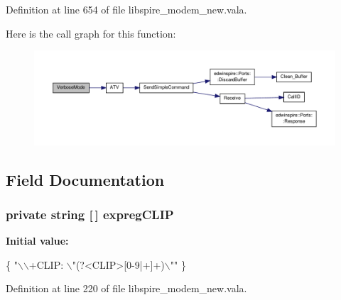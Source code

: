 Definition at line 654 of file libspire\-\_\-modem\-\_\-new.\-vala.



Here is the call graph for this function\-:\nopagebreak
\begin{figure}[H]
\begin{center}
\leavevmode
\includegraphics[width=350pt]{classedwinspire_1_1_ports_1_1_modem_a9f637839b975c7d8790461440e10abfd_cgraph}
\end{center}
\end{figure}




\subsection{Field Documentation}
\hypertarget{classedwinspire_1_1_ports_1_1_modem_a4c8278a9e11f6d3e376d161ad2d21cb0}{
\subsubsection[{expreg\-C\-L\-I\-P}]{\setlength{\rightskip}{0pt plus 5cm}private string \mbox{[}$\,$\mbox{]} expreg\-C\-L\-I\-P\hspace{0.3cm}{\ttfamily [private]}}}\label{classedwinspire_1_1_ports_1_1_modem_a4c8278a9e11f6d3e376d161ad2d21cb0}
{\bfseries Initial value\-:}
\begin{DoxyCode}
 \{
                                \textcolor{stringliteral}{"\(\backslash\)\(\backslash\)+CLIP: \(\backslash\)"(?<CLIP>[0-9|+]+)\(\backslash\)""}
                        \}
\end{DoxyCode}


Definition at line 220 of file libspire\-\_\-modem\-\_\-new.\-vala.


